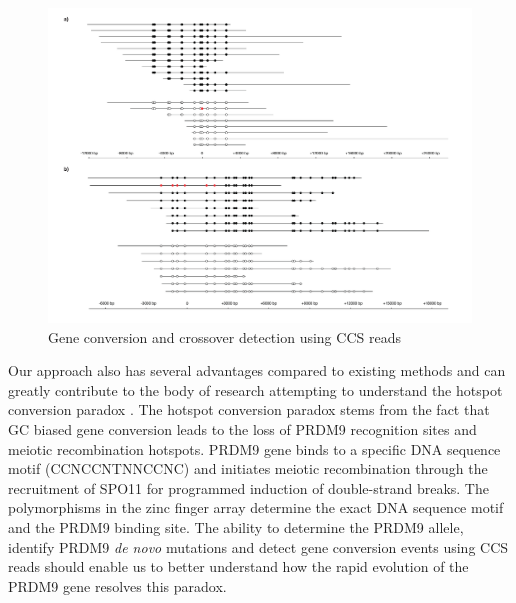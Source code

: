 \begin{figure}[h!]
\caption{Gene conversion and crossover detection using CCS reads}
\label{figure:phase-transitions}
\begin{centering}
\includegraphics[width=\textwidth]{meiotic_recombination_detection.pdf} 
\end{centering}
\end{figure}

Our approach also has several advantages compared to existing methods and can greatly contribute to the body of research attempting to understand the hotspot conversion paradox \cite{Boulton1997-do}. The hotspot conversion paradox stems from the fact that GC biased gene conversion leads to the loss of PRDM9 recognition sites and meiotic recombination hotspots. PRDM9 gene binds to a specific DNA sequence motif (CCNCCNTNNCCNC) \cite{Myers2008-st} and initiates meiotic recombination through the recruitment of SPO11 for programmed induction of double-strand breaks. The polymorphisms in the zinc finger array determine the exact DNA sequence motif and the PRDM9 binding site. The ability to determine the PRDM9 allele, identify PRDM9 \textit{de novo} mutations and detect gene conversion events using CCS reads should enable us to better understand how the rapid evolution of the PRDM9 gene resolves this paradox. 

